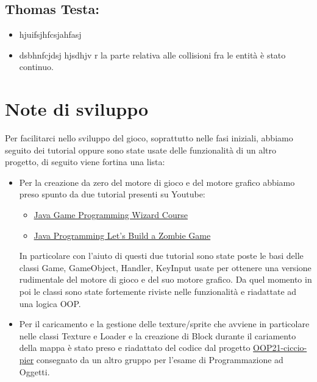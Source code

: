 \documentclass[a4paper,12pt]{report}
\begin{document}
\subsection*{Thomas Testa:}
\begin{itemize}
	\item hjuifsjhfcsjahfasj
	\item dsbhnfcjdsj hjsdhjv r la parte relativa alle collisioni fra le entità è stato continuo.
\end{itemize}

\paragraph{}


\section{Note di sviluppo}

Per facilitarci nello sviluppo del gioco, soprattutto nelle fasi iniziali, abbiamo seguito dei tutorial oppure sono state usate delle funzionalità di un altro progetto, di seguito viene fortina una lista:
\begin{itemize}
	\item Per la creazione da zero del motore di gioco e del motore grafico abbiamo preso spunto da due tutorial presenti su Youtube: 
	 \begin{itemize}
	 	\item \href{https://www.youtube.com/playlist?list=PLWms45O3n--5vDnNd6aiu1CSWX3JlCU1n}{Java Game Programming Wizard Course}
	 	\item \href{https://www.youtube.com/playlist?list=PLWms45O3n--5vv69_AlMw23O1Z31CaW1F}{Java Programming Let's Build a Zombie Game}
	 \end{itemize}
	 In particolare con l'aiuto di questi due tutorial sono state poste le basi delle classi Game, GameObject, Handler, KeyInput usate per ottenere una versione rudimentale del motore di gioco e del suo motore grafico.
	 Da quel momento in poi le classi sono state fortemente riviste nelle funzionalità e riadattate ad una logica OOP.
	 
	 \item Per il caricamento e la gestione delle texture/sprite che avviene in particolare nelle classi Texture e Loader e la creazione di Block durante il cariamento della mappa è stato preso e riadattato del codice dal progetto 
	 \href{https://github.com/Valdi1111/OOP21-ciccio-pier}{OOP21-ciccio-pier} consegnato da un altro gruppo per l'esame di Programmazione ad Oggetti.
	 
\end{itemize}
\end{document}
